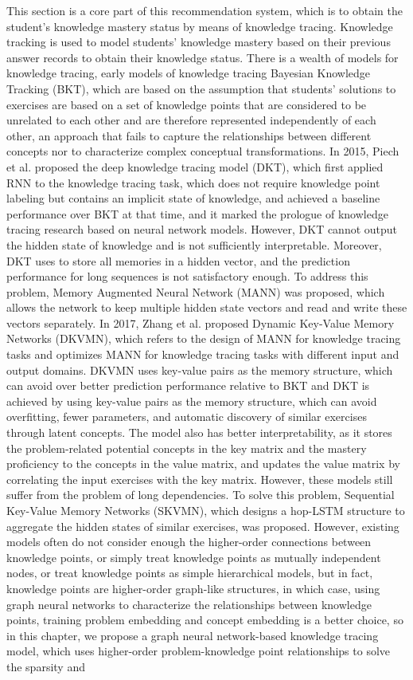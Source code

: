 This section is a core part of this recommendation system, which is to obtain the student's knowledge mastery status by means of knowledge tracing. Knowledge tracking is used to model students' knowledge mastery based on their previous answer records to obtain their knowledge status. There is a wealth of models for knowledge tracing, early models of knowledge tracing Bayesian Knowledge Tracking (BKT)\cite{yudelson2013individualized}, which are based on the assumption that students' solutions to exercises are based on a set of knowledge points that are considered to be unrelated to each other and are therefore represented independently of each other, an approach that fails to capture the relationships between different concepts nor to characterize complex conceptual transformations. In 2015, Piech et al. proposed the deep knowledge tracing model (DKT), which first applied RNN to the knowledge tracing task, which does not require knowledge point labeling but contains an implicit state of knowledge, and achieved a baseline performance over BKT at that time, and it marked the prologue of knowledge tracing research based on neural network models. However, DKT cannot output the hidden state of knowledge and is not sufficiently interpretable. Moreover, DKT uses to store all memories in a hidden vector, and the prediction performance for long sequences is not satisfactory enough. To address this problem, Memory Augmented Neural Network (MANN)\cite{santoro2016meta} was proposed, which allows the network to keep multiple hidden state vectors and read and write these vectors separately. In 2017, Zhang et al. proposed Dynamic Key-Value Memory Networks (DKVMN)\cite{zhang2017dynamic}, which refers to the design of MANN for knowledge tracing tasks and optimizes MANN for knowledge tracing tasks with different input and output domains. DKVMN uses key-value pairs as the memory structure, which can avoid over better prediction performance relative to BKT and DKT is achieved by using key-value pairs as the memory structure, which can avoid overfitting, fewer parameters, and automatic discovery of similar exercises through latent concepts. The model also has better interpretability, as it stores the problem-related potential concepts in the key matrix and the mastery proficiency to the concepts in the value matrix, and updates the value matrix by correlating the input exercises with the key matrix. However, these models still suffer from the problem of long dependencies. To solve this problem, Sequential Key-Value Memory Networks (SKVMN)\cite{Abdelrahman_2019}, which designs a hop-LSTM structure to aggregate the hidden states of similar exercises, was proposed. However, existing models often do not consider enough the higher-order connections between knowledge points, or simply treat knowledge points as mutually independent nodes, or treat knowledge points as simple hierarchical models, but in fact, knowledge points are higher-order graph-like structures, in which case, using graph neural networks to characterize the relationships between knowledge points, training problem embedding and concept embedding is a better choice, so in this chapter, we propose a graph neural network-based knowledge tracing model, which uses higher-order problem-knowledge point relationships to solve the sparsity and 